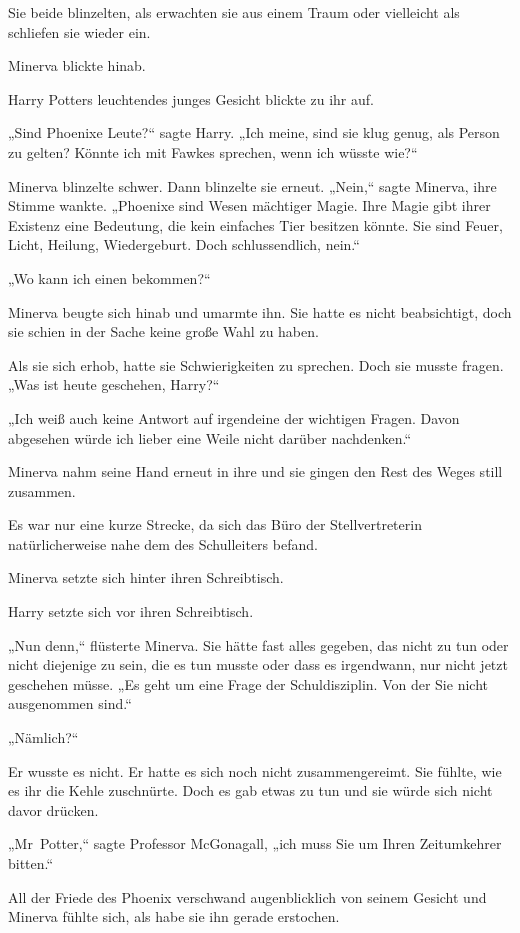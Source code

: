 {Sie beide blinzelten, als erwachten sie aus einem Traum oder vielleicht als schliefen sie wieder ein.

Minerva blickte hinab.

Harry Potters leuchtendes junges Gesicht blickte zu ihr auf.

„Sind Phoenixe Leute?“ sagte Harry. „Ich meine, sind sie klug genug, als Person zu gelten? Könnte ich mit Fawkes sprechen, wenn ich wüsste wie?“

Minerva blinzelte schwer. Dann blinzelte sie erneut. „Nein,“ sagte Minerva, ihre Stimme wankte. „Phoenixe sind Wesen mächtiger Magie. Ihre Magie gibt ihrer Existenz eine Bedeutung, die kein einfaches Tier besitzen könnte. Sie sind Feuer, Licht, Heilung, Wiedergeburt. Doch schlussendlich, nein.“

„Wo kann ich einen bekommen?“

Minerva beugte sich hinab und umarmte ihn. Sie hatte es nicht beabsichtigt, doch sie schien in der Sache keine große Wahl zu haben.

Als sie sich erhob, hatte sie Schwierigkeiten zu sprechen. Doch sie musste fragen. „Was ist heute geschehen, Harry?“

„Ich weiß auch keine Antwort auf irgendeine der wichtigen Fragen. Davon abgesehen würde ich lieber eine Weile nicht darüber nachdenken.“

Minerva nahm seine Hand erneut in ihre und sie gingen den Rest des Weges still zusammen.

Es war nur eine kurze Strecke, da sich das Büro der Stellvertreterin natürlicherweise nahe dem des Schulleiters befand.

Minerva setzte sich hinter ihren Schreibtisch.

Harry setzte sich vor ihren Schreibtisch.

„Nun denn,“ flüsterte Minerva. Sie hätte fast alles gegeben, das nicht zu tun oder nicht diejenige zu sein, die es tun musste oder dass es irgendwann, nur nicht jetzt geschehen müsse. „Es geht um eine Frage der Schuldisziplin. Von der Sie nicht ausgenommen sind.“

„Nämlich?“

Er wusste es nicht. Er hatte es sich noch nicht zusammengereimt. Sie fühlte, wie es ihr die Kehle zuschnürte. Doch es gab etwas zu tun und sie würde sich nicht davor drücken.

„Mr~Potter,“ sagte Professor McGonagall, „ich muss Sie um Ihren Zeitumkehrer bitten.“

All der Friede des Phoenix verschwand augenblicklich von seinem Gesicht und Minerva fühlte sich, als habe sie ihn gerade erstochen.

}
